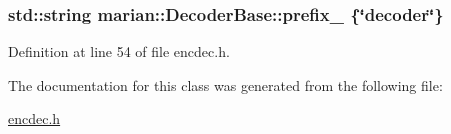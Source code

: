 \subsubsection[{\texorpdfstring{prefix\+\_\+}{prefix_}}]{\setlength{\rightskip}{0pt plus 5cm}std\+::string marian\+::\+Decoder\+Base\+::prefix\+\_\+ \{\char`\"{}decoder\char`\"{}\}\hspace{0.3cm}{\ttfamily [protected]}}\hypertarget{classmarian_1_1DecoderBase_a043a90801b6bda9a45e309607136e947}{}\label{classmarian_1_1DecoderBase_a043a90801b6bda9a45e309607136e947}


Definition at line 54 of file encdec.\+h.



The documentation for this class was generated from the following file\+:\begin{DoxyCompactItemize}
\item 
\hyperlink{encdec_8h}{encdec.\+h}\end{DoxyCompactItemize}
